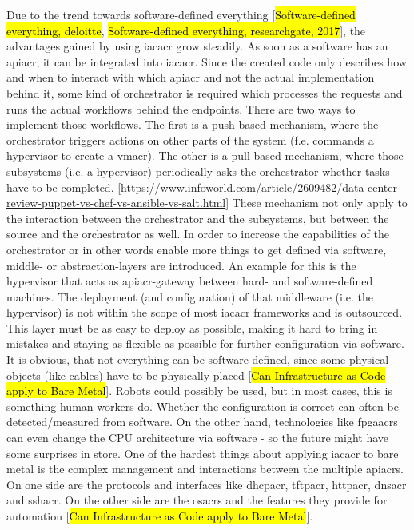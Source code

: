 \newline
Due to the trend towards software-defined everything [\hl{Software-defined everything, deloitte}, \hl{Software-defined everything, researchgate, 2017}], the advantages gained by using \gls{iacacr} grow steadily. As soon as a software has an \gls{apiacr}, it can be integrated into \gls{iacacr}. Since the created code only describes how and when to interact with which \gls{apiacr} and not the actual implementation behind it, some kind of orchestrator is required which processes the requests and runs the actual workflows behind the endpoints.
\newline
There are two ways to implement those workflows. The first is a push-based mechanism, where the orchestrator triggers actions on other parts of the system (f.e. commands a hypervisor to create a \gls{vmacr}). The other is a pull-based mechanism, where those subsystems (i.e. a hypervisor) periodically asks the orchestrator whether tasks have to be completed. [\url{https://www.infoworld.com/article/2609482/data-center-review-puppet-vs-chef-vs-ansible-vs-salt.html}]
\newline
These mechanism not only apply to the interaction between the orchestrator and the subsystems, but between the source and the orchestrator as well.
\newline
In order to increase the capabilities of the orchestrator or in other words enable more things to get defined via software, middle- or abstraction-layers are introduced. An example for this is the hypervisor that acts as \gls{apiacr}-gateway between hard- and software-defined machines. The deployment (and configuration) of that middleware (i.e. the hypervisor) is not within the scope of most \gls{iacacr} frameworks and is outsourced. This layer must be as easy to deploy as possible, making it hard to bring in mistakes and staying as flexible as possible for further configuration via software.
\newline
It is obvious, that not everything can be software-defined, since some physical objects (like cables) have to be physically placed [\hl{Can Infrastructure as Code apply to Bare Metal}]. Robots could possibly be used, but in most cases, this is something human workers do. Whether the configuration is correct can often be detected/measured from software. On the other hand, technologies like \gls{fpgaacr}s can even change the CPU architecture via software - so the future might have some surprises in store.
\newline
One of the hardest things about applying \gls{iacacr} to bare metal is the complex management and interactions between the multiple \gls{apiacr}s. On one side are the  protocols and interfaces like \gls{dhcpacr}, \gls{tftpacr}, \gls{httpacr}, \gls{dnsacr} and \gls{sshacr}. On the other side are the \gls{osacr}s and the features they provide for automation [\hl{Can Infrastructure as Code apply to Bare Metal}].
